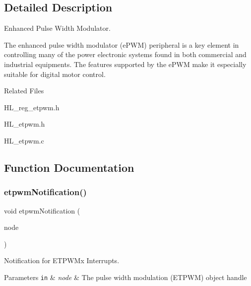 \subsection{Detailed Description}
Enhanced Pulse Width Modulator. 

The enhanced pulse width modulator (e\+P\+WM) peripheral is a key element in controlling many of the power electronic systems found in both commercial and industrial equipments. The features supported by the e\+P\+WM make it especially suitable for digital motor control.

Related Files
\begin{DoxyItemize}
\item H\+L\+\_\+reg\+\_\+etpwm.\+h
\item H\+L\+\_\+etpwm.\+h
\item H\+L\+\_\+etpwm.\+c 
\end{DoxyItemize}

\subsection{Function Documentation}
\mbox{\label{group__ePWM_gafaa5c117b76b6b08df02364245b78daf}} 
\subsubsection{\texorpdfstring{etpwm\+Notification()}{etpwmNotification()}}
{\footnotesize\ttfamily void etpwm\+Notification (\begin{DoxyParamCaption}\item[{\mbox{\hyperlink{reg__etpwm_8h_a3030c3a8f18ffd60ee3de5bbd7632891}{etpwm\+B\+A\+S\+E\+\_\+t}} $\ast$}]{node }\end{DoxyParamCaption})}



Notification for E\+T\+P\+W\+Mx Interrupts. 


\begin{DoxyParams}[1]{Parameters}
\mbox{\tt in}  & {\em node} & The pulse width modulation (E\+T\+P\+WM) object handle \\
\hline
\end{DoxyParams}
\mbox{\label{group__ePWM_ga9ef5c284f9f7b5d948f438a6a4288fc6}} 

